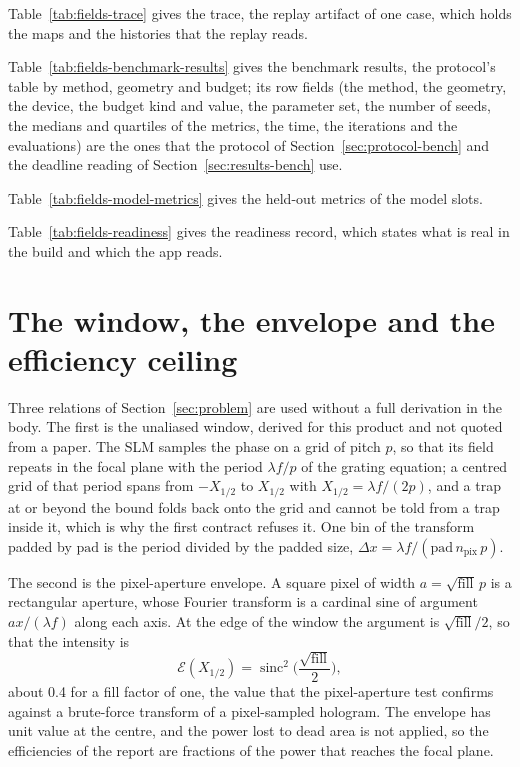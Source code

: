 

Table~\ref{tab:fields-trace} gives the trace, the replay artifact of one case, which holds the maps and the histories that the replay reads.



Table~\ref{tab:fields-benchmark-results} gives the benchmark results, the protocol's table by method, geometry and budget; its row fields (the method, the geometry, the device, the budget kind and value, the parameter set, the number of seeds, the medians and quartiles of the metrics, the time, the iterations and the evaluations) are the ones that the protocol of Section~\ref{sec:protocol-bench} and the deadline reading of Section~\ref{sec:results-bench} use.



Table~\ref{tab:fields-model-metrics} gives the held-out metrics of the model slots.



Table~\ref{tab:fields-readiness} gives the readiness record, which states what is real in the build and which the app reads.



\section{The window, the envelope and the efficiency ceiling}\label{app:derivations}

Three relations of Section~\ref{sec:problem} are used without a full derivation in the body. The first is the unaliased window, derived for this product and not quoted from a paper. The SLM samples the phase on a grid of pitch $p$, so that its field repeats in the focal plane with the period $\lambda f/p$ of the grating equation; a centred grid of that period spans from $-X_{1/2}$ to $X_{1/2}$ with $X_{1/2}=\lambda f/(2p)$, and a trap at or beyond the bound folds back onto the grid and cannot be told from a trap inside it, which is why the first contract refuses it. One bin of the transform padded by $\mathrm{pad}$ is the period divided by the padded size, $\Delta x=\lambda f/(\mathrm{pad}\,n_{\mathrm{pix}}\,p)$.

The second is the pixel-aperture envelope. A square pixel of width $a=\sqrt{\mathrm{fill}}\,p$ is a rectangular aperture, whose Fourier transform is a cardinal sine of argument $a x/(\lambda f)$ along each axis. At the edge of the window the argument is $\sqrt{\mathrm{fill}}/2$, so that the intensity is
\begin{equation}
\mathcal E(X_{1/2})=\operatorname{sinc}^2\!\Big(\frac{\sqrt{\mathrm{fill}}}{2}\Big),
\label{eq:envelope-edge}
\end{equation}
about 0.4 for a fill factor of one, the value that the pixel-aperture test confirms against a brute-force transform of a pixel-sampled hologram. The envelope has unit value at the centre, and the power lost to dead area is not applied, so the efficiencies of the report are fractions of the power that reaches the focal plane.

